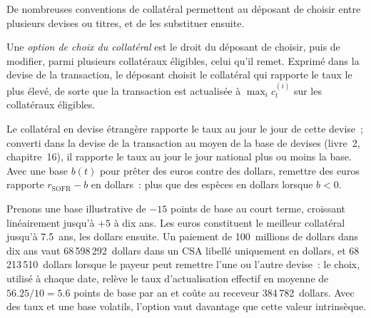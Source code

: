De nombreuses conventions de collatéral permettent au déposant de choisir entre plusieurs devises ou
titres, et de les substituer ensuite.

\begin{definition}\label{def:rc:multi-curve-and-collateral-discounting:choice}
Une \emph{option de choix du collatéral} est le
droit du déposant de choisir, puis de modifier, parmi plusieurs collatéraux éligibles, celui
qu'il remet. Exprimé dans la devise de la transaction, le déposant choisit
le collatéral qui rapporte le taux le plus élevé, de sorte que la transaction est actualisée à
$\max_i c^{(i)}_t$ sur les collatéraux éligibles.
\end{definition}

Le collatéral en devise étrangère rapporte le taux au jour le jour de cette devise~; converti
dans la devise de la transaction au moyen de la base de devises (livre~2,
chapitre~16), il rapporte le taux au jour le jour national plus ou moins la base.
Avec une base $b(t)$ pour prêter des euros contre des dollars, remettre des euros
rapporte $r_{\text{SOFR}}-b$ en dollars~: plus que des espèces en dollars lorsque $b<0$.

\begin{example}\label{ex:rc:multi-curve-and-collateral-discounting:choice}
Prenons une base illustrative de $-15$ points de base au court terme, croissant linéairement
jusqu'à $+5$ à dix ans. Les euros constituent le meilleur collatéral jusqu'à 7.5~ans, les dollars
ensuite. Un paiement de 100~millions de dollars dans dix ans vaut 68\,598\,292~dollars
dans un CSA libellé uniquement en dollars, et 68\,213\,510~dollars lorsque le payeur peut remettre l'une ou l'autre
devise~: le choix, utilisé à chaque date, relève le taux d'actualisation effectif
en moyenne de $56.25/10 = 5.6$ points de base par an et coûte au receveur
384\,782~dollars. Avec des taux et une base volatils, l'option vaut davantage que cette
valeur intrinsèque.
\end{example}

